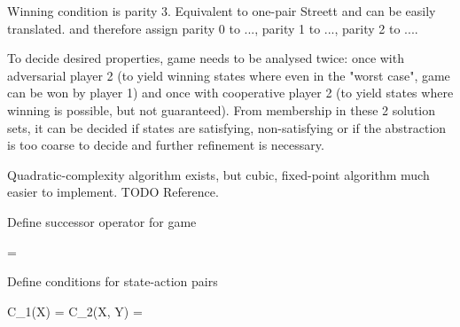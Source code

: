 Winning condition is parity 3.
Equivalent to one-pair Streett and can be easily translated.
 and therefore assign parity 0 to ..., parity 1 to ..., parity 2 to ....


    \startalgorithmic
            \DO
                \DO
                    \DO
        \ENDFUNCTION
    \stopalgorithmic
\stopbuffer

\startsubsection[title={Product Game Solution}]

    To decide desired properties, game needs to be analysed twice:
    once with adversarial player 2 (to yield winning states where even in the "worst case", game can be won by player 1) and once with cooperative player 2 (to yield states where winning is possible, but not guaranteed).
    From membership in these 2 solution sets, it can be decided if states are satisfying, non-satisfying or if the abstraction is too coarse to decide and further refinement is necessary.

    Quadratic-complexity algorithm exists, but cubic, fixed-point algorithm much easier to implement.
    TODO Reference.

    Define successor operator for game

    \startformula
         = 
    \stopformula

    Define conditions for state-action pairs

    \startformula
        \startalign[n=2,align={right,left}]
            \NC C_1(X) =
            \NC {}
            \NR
            \NC C_2(X, Y) =
            \NC {}
            \NR
        \stopalign
    \stopformula

